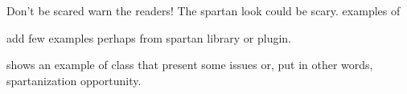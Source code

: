 Don't be scared warn the readers!
The spartan look could be scary.
examples of  

add few examples perhaps from spartan library or plugin. 

 shows an example of class 
that present some issues or, put in other words, spartanization opportunity. 



